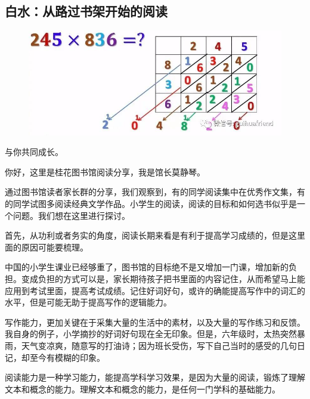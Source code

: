 \vspace{10pt}

{\centering\subsection*{白水：从路过书架开始的阅读}}


\renewcommand{\leftmark}{白水：从路过书架开始的阅读}

\begin{figure}[htbp]

\centering

\includegraphics[width = .5\textwidth]{./ch/v5.jpg}

\end{figure}

与你共同成长。



你好，这里是桂花图书馆阅读分享，我是馆长莫静琴。



通过图书馆读者家长群的分享，我们观察到，有的同学阅读集中在优秀作文集，有的同学试图多阅读经典文学作品。小学生的阅读，阅读的目标和如何选书似乎是一个问题。我们想在这里进行探讨。



首先，从功利或者务实的角度，阅读长期来看是有利于提高学习成绩的，但是这里面的原因可能要梳理。



中国的小学生课业已经够重了，图书馆的目标绝不是又增加一门课，增加新的负担。变成负担的方式可以是，家长期待孩子把书里面的内容记住，从而希望马上能应用到考试里面，提高考试成绩。记住好词好句，或许的确能提高写作中的词汇的水平，但是可能无助于提高写作的逻辑能力。



写作能力，更加关键在于采集大量的生活中的素材，以及大量的写作练习和反馈。我自身的例子，小学摘抄的好词好句现在全无印象。但是，六年级时，太热突然暴雨，天气变凉爽，随意写的打油诗；因为班长受伤，写下自己当时的感受的几句日记，却至今有模糊的印象。



阅读能力是一种学习能力，能提高学科学习效果，是因为大量的阅读，锻炼了理解文本和概念的能力。理解文本和概念的能力，是任何一门学科的基础能力。



